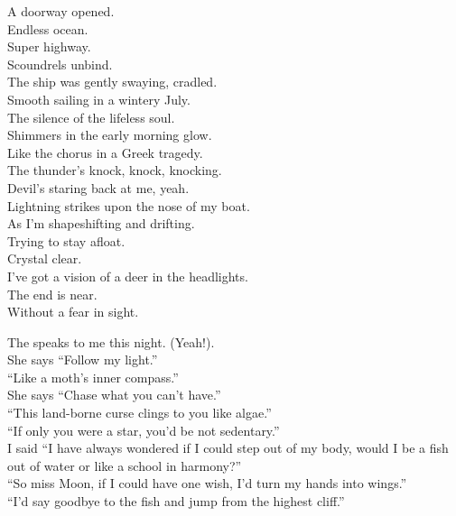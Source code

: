 



A doorway opened. \\
Endless ocean. \\
Super highway. \\
Scoundrels unbind. \\
The ship was gently swaying, cradled. \\
Smooth sailing in a wintery July. \\
The silence of the lifeless soul. \\
Shimmers in the early morning glow. \\
Like the chorus in a Greek tragedy. \\
The thunder's knock, knock, knocking. \\
Devil's staring back at me, yeah. \\

Lightning strikes upon the nose of my boat. \\
As I'm shapeshifting and drifting. \\
Trying to stay afloat. \\
Crystal clear. \\
I've got a vision of a deer in the headlights. \\
The end is near. \\
Without a fear in sight. \\


The  speaks to me this night. (Yeah!). \\
She says ``Follow my light.'' \\
``Like a moth's inner compass.'' \\
She says ``Chase what you can't have.'' \\
``This land-borne curse clings to you like algae.'' \\
``If only you were a star, you'd be not sedentary.'' \\
I said ``I have always wondered if I could step out of my body, would I be a fish out of water or like a school in harmony?'' \\
``So miss Moon, if I could have one wish, I'd turn my hands into wings.'' \\
``I'd say goodbye to the fish and jump from the highest cliff.'' \\

